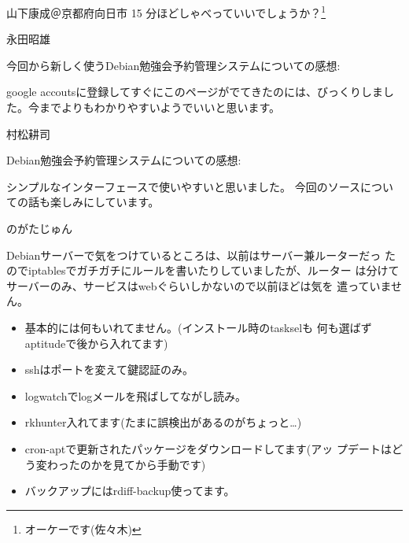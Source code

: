 \documentclass[mingoth,a4paper]{jsarticle}
\begin{document}
\begin{prework*}{ 山下康成＠京都府向日市 }
    15 分ほどしゃべっていいでしょうか？\footnote{オーケーです(佐々木)}
\end{prework*}

\begin{prework*}{ 永田昭雄 }

    今回から新しく使うDebian勉強会予約管理システムについての感想:

    google accoutsに登録してすぐにこのページがでてきたのには、びっくりしまし
    た。今までよりもわかりやすいようでいいと思います。
    
\end{prework*}


\begin{prework*}{ 村松耕司 }

    Debian勉強会予約管理システムについての感想:
    
    シンプルなインターフェースで使いやすいと思いました。
    今回のソースについての話も楽しみにしています。
    
\end{prework*}

\begin{prework*}{ のがたじゅん }

    Debianサーバーで気をつけているところは、以前はサーバー兼ルーターだっ
    たのでiptablesでガチガチにルールを書いたりしていましたが、ルーター
    は分けてサーバーのみ、サービスはwebぐらいしかないので以前ほどは気を
    遣っていません。
    
    \begin{itemize}
          \item 基本的には何もいれてません。(インストール時のtaskselも
        何も選ばずaptitudeで後から入れてます)
          \item sshはポートを変えて鍵認証のみ。
          \item logwatchでlogメールを飛ばしてながし読み。
          \item rkhunter入れてます(たまに誤検出があるのがちょっと…)
          \item cron-aptで更新されたパッケージをダウンロードしてます(アッ
        プデートはどう変わったのかを見てから手動です)
          \item バックアップにはrdiff-backup使ってます。
    \end{itemize}

\end{prework*}
\end{document}
